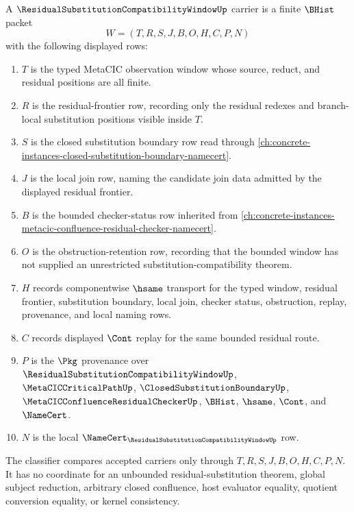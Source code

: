 \begin{definition}
\label{def:residual-substitution-compatibility-window-carrier}
A $\ResidualSubstitutionCompatibilityWindowUp$ carrier is a finite $\BHist$ packet
$$
W=(T,R,S,J,B,O,H,C,P,N)
$$
with the following displayed rows:
\begin{enumerate}
\item $T$ is the typed MetaCIC observation window whose source, reduct, and residual positions are all finite.
\item $R$ is the residual-frontier row, recording only the residual redexes and branch-local substitution positions visible inside $T$.
\item $S$ is the closed substitution boundary row read through \autoref{ch:concrete-instances-closed-substitution-boundary-namecert}.
\item $J$ is the local join row, naming the candidate join data admitted by the displayed residual frontier.
\item $B$ is the bounded checker-status row inherited from \autoref{ch:concrete-instances-metacic-confluence-residual-checker-namecert}.
\item $O$ is the obstruction-retention row, recording that the bounded window has not supplied an unrestricted substitution-compatibility theorem.
\item $H$ records componentwise $\hsame$ transport for the typed window, residual frontier, substitution boundary, local join, checker status, obstruction, replay, provenance, and local naming rows.
\item $C$ records displayed $\Cont$ replay for the same bounded residual route.
\item $P$ is the $\Pkg$ provenance over $\ResidualSubstitutionCompatibilityWindowUp$, $\MetaCICCriticalPathUp$, $\ClosedSubstitutionBoundaryUp$, $\MetaCICConfluenceResidualCheckerUp$, $\BHist$, $\hsame$, $\Cont$, and $\NameCert$.
\item $N$ is the local $\NameCert_{\ResidualSubstitutionCompatibilityWindowUp}$ row.
\end{enumerate}
The classifier compares accepted carriers only through $T,R,S,J,B,O,H,C,P,N$. It has no coordinate for an unbounded residual-substitution theorem, global subject reduction, arbitrary closed confluence, host evaluator equality, quotient conversion equality, or kernel consistency.
\end{definition}


